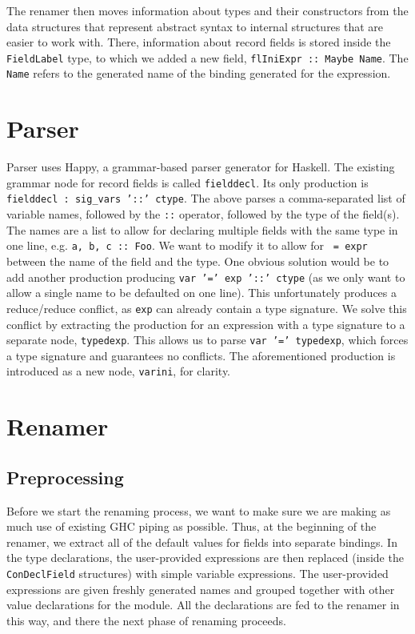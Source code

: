\documentclass[en]{pracamgr}
\begin{document}
The renamer then moves information about types and their constructors from the data structures that represent abstract syntax to internal structures that are easier to work with.
There, information about record fields is stored inside the \texttt{FieldLabel} type, to which we added a new field, \texttt{flIniExpr :: Maybe Name}.
The \texttt{Name} refers to the generated name of the binding generated for the expression.

\section{Parser}
Parser uses Happy, a grammar-based parser generator for Haskell.
The existing grammar node for record fields is called \texttt{fielddecl}.
Its only production is \texttt{fielddecl : sig\_vars '::' ctype}.
The above parses a comma-separated list of variable names, followed by the \texttt{::} operator, followed by the type of the field(s).
The names are a list to allow for declaring multiple fields with the same type in one line, e.g. \texttt{a, b, c :: Foo}.
We want to modify it to allow for \texttt{ = expr} between the name of the field and the type.
One obvious solution would be to add another production producing \texttt{var '=' exp '::' ctype} (as we only want to allow a single name to be defaulted on one line).
This unfortunately produces a reduce/reduce conflict, as \texttt{exp} can already contain a type signature. 
We solve this conflict by extracting the production for an expression with a type signature to a separate node, \texttt{typedexp}.
This allows us to parse \texttt{var '=' typedexp}, which forces a type signature and guarantees no conflicts.
The aforementioned production is introduced as a new node, \texttt{varini}, for clarity.

\section{Renamer}
\subsection{Preprocessing}
Before we start the renaming process, we want to make sure we are making as much use of existing GHC piping as possible.
Thus, at the beginning of the renamer, we extract all of the default values for fields into separate bindings.
In the type declarations, the user-provided expressions are then replaced (inside the \texttt{ConDeclField} structures) with simple variable expressions.
The user-provided expressions are given freshly generated names and grouped together with other value declarations for the module.
All the declarations are fed to the renamer in this way, and there the next phase of renaming proceeds.
\end{document}
